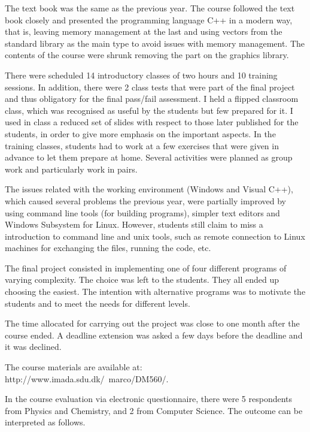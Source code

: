 \documentclass[11pt]{article}
\begin{document}
The text book was the same as the previous year. The course followed
the text book closely and presented the programming language C++ in a
modern way, that is, leaving memory management at the last and using
vectors from the standard library as the main type to avoid issues with
memory management.  The contents of the course were shrunk removing the
part on the graphics library.

There were scheduled 14 introductory classes of two hours and 10
training sessions. In addition, there were 2 class tests that were part
of the final project and thus obligatory for the final pass/fail
assessment. I held a flipped classroom class, which was recognised as
useful by the students but few prepared for it. I used in class a
reduced set of slides with respect to those later published for the
students, in order to give more emphasis on the important aspects.  In
the training classes, students had to work at a few exercises that were
given in advance to let them prepare at home. Several activities were
planned as group work and particularly work in pairs.

The issues related with the working environment (Windows and Visual
C++), which caused several problems the previous year, were partially
improved by using command line tools (for building programs), simpler
text editors and Windows Subsystem for Linux. However, students still
claim to miss a introduction to command line and unix tools, such as
remote connection to Linux machines for exchanging the files, running
the code, etc.

The final project consisted in implementing one of four different
programs of varying complexity. The choice was left to the
students. They all ended up choosing the easiest. The intention with
alternative programs was to motivate the students and to meet the
needs for different levels.

The time allocated for carrying out the project was close to one month
after the course ended. A deadline extension was asked a few days before
the deadline and it was declined.

The course materials are available at:
http://www.imada.sdu.dk/~marco/DM560/.

\medskip
In the course evaluation via electronic questionnaire, there were 5
respondents from Physics and Chemistry, and 2 from Computer Science.
The outcome can be interpreted as follows.
\end{document}
